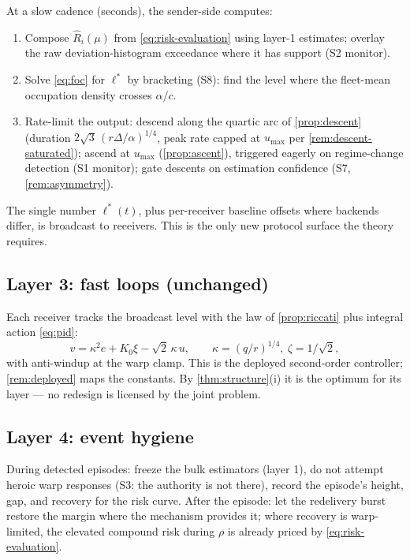 \documentclass[11pt, a4paper]{article}
\theoremstyle{definition}
\theoremstyle{plain}
\theoremstyle{remark}
\begin{document}
At a slow cadence (seconds), the sender-side computes:
\begin{enumerate}
  \item Compose $\hat R_i(\mu)$ from \cref{eq:risk-evaluation} using
    layer-1 estimates; overlay the raw deviation-histogram exceedance
    where it has support (S2 monitor).
  \item Solve \cref{eq:foc} for $\ell^*$ by bracketing (S8): find the
    level where the fleet-mean occupation density crosses $\alpha/c$.
  \item Rate-limit the output: descend along the quartic arc of
    \cref{prop:descent} (duration $2\sqrt3\,(r\Delta/\alpha)^{1/4}$,
    peak rate capped at $u_{\max}$ per
    \cref{rem:descent-saturated}); ascend at $u_{\max}$
    (\cref{prop:ascent}), triggered eagerly on regime-change
    detection (S1 monitor); gate descents on estimation confidence
    (S7, \cref{rem:asymmetry}).
\end{enumerate}
The single number $\ell^*(t)$, plus per-receiver baseline offsets where
backends differ, is broadcast to receivers.  This is the only new
protocol surface the theory requires.

\subsection{Layer 3: fast loops (unchanged)}\label{sec:layer-fast}

Each receiver tracks the broadcast level with the law of
\cref{prop:riccati} plus integral action \cref{eq:pid}:
\[
  v = \kappa^2 e + K_0 \xi - \sqrt2\,\kappa\, u,
  \qquad \kappa = (q/r)^{1/4},\ \zeta = 1/\sqrt2,
\]
with anti-windup at the warp clamp.  This is the deployed second-order
controller; \cref{rem:deployed} maps the constants.  By
\cref{thm:structure}(i) it is the optimum for its layer --- no redesign
is licensed by the joint problem.

\subsection{Layer 4: event hygiene}\label{sec:layer-hygiene}

During detected episodes: freeze the bulk estimators (layer 1), do not
attempt heroic warp responses (S3: the authority is not there), record
the episode's height, gap, and recovery for the risk curve.  After the
episode: let the redelivery burst restore the margin where the
mechanism provides it; where recovery is warp-limited, the elevated
compound risk during $\rho$ is already priced by
\cref{eq:risk-evaluation}.
\end{document}
